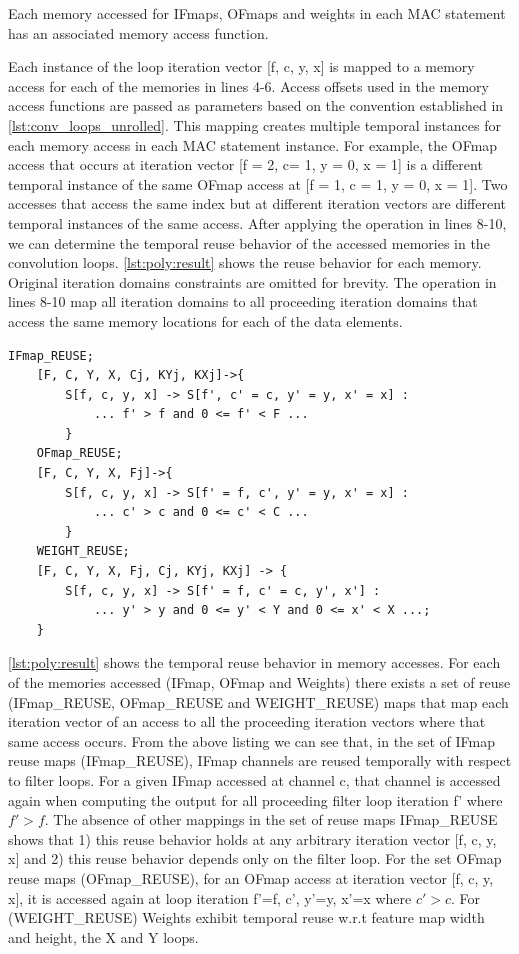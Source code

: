 Each memory accessed for IFmaps, OFmaps and weights in each MAC statement has
an associated memory access function. 

Each instance of the loop iteration vector [f, c, y, x]
is mapped to a memory access for each of the memories in lines 4-6. Access
offsets used in the memory access functions are passed as parameters based on
the convention established in \autoref{lst:conv_loops_unrolled}. This mapping
creates multiple temporal instances for each memory access in each \ac{MAC}
statement instance.  For
example, the OFmap access that occurs at iteration vector [f = 2, c= 1, y = 0,
x = 1] is a different temporal instance of the same OFmap access at [f = 1, c = 1,
y = 0, x = 1]. 
Two accesses that access the same index but at different
iteration vectors are different temporal instances of the same access.
After applying the operation in lines 8-10, we can determine the
temporal reuse behavior of the accessed memories in the convolution loops.  
\autoref{lst:poly:result} shows the reuse behavior for each memory. Original
iteration domains constraints are omitted for brevity. The operation in lines
8-10 map all iteration domains to all proceeding iteration domains that access
the same memory locations for each of the data elements.

\clearpage
\begin{lstlisting}[caption=Polyhedral analysis results w.r.t data elements in convolution loops, label={lst:poly:result}]
    IFmap_REUSE;
    [F, C, Y, X, Cj, KYj, KXj]->{
        S[f, c, y, x] -> S[f', c' = c, y' = y, x' = x] :
            ... f' > f and 0 <= f' < F ... 
        }
    OFmap_REUSE;
    [F, C, Y, X, Fj]->{ 
        S[f, c, y, x] -> S[f' = f, c', y' = y, x' = x] : 
            ... c' > c and 0 <= c' < C ... 
        }
    WEIGHT_REUSE;
    [F, C, Y, X, Fj, Cj, KYj, KXj] -> { 
        S[f, c, y, x] -> S[f' = f, c' = c, y', x'] : 
            ... y' > y and 0 <= y' < Y and 0 <= x' < X ...; 
    }
\end{lstlisting}

\autoref{lst:poly:result} shows the temporal reuse behavior in memory accesses. For each
of the memories accessed (IFmap, OFmap and Weights) there exists a set of reuse
(IFmap\_REUSE, OFmap\_REUSE and WEIGHT\_REUSE) maps that map each iteration
vector of an access to all the proceeding iteration vectors where that same
access occurs. From the above listing we can see that, in the set of IFmap reuse
maps (IFmap\_REUSE), IFmap channels are reused temporally with respect to filter
loops. For a given IFmap accessed at channel c, that channel is accessed again
when computing the output for all proceeding filter loop iteration f' where
$f'>f$. The absence of other mappings in the set of reuse maps IFmap\_REUSE shows
that 1) this reuse behavior holds at any arbitrary iteration vector [f, c, y, x]
and 2) this reuse behavior depends only on the filter loop. For the set OFmap
reuse maps (OFmap\_REUSE), for an OFmap access at iteration vector [f, c, y,
x], it is accessed again at loop iteration f'=f, c', y'=y, x'=x where $c'>c$.  
For (WEIGHT\_REUSE) Weights exhibit temporal reuse w.r.t feature map width and
height, the X and Y loops. 


